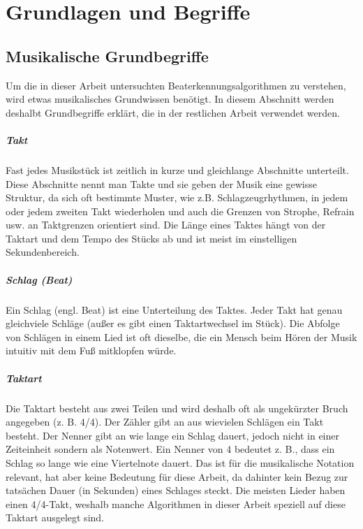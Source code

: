 \chapter{Grundlagen und Begriffe}
\label{grundlagen}

\section{Musikalische Grundbegriffe}
{
	Um die in dieser Arbeit untersuchten Beaterkennungsalgorithmen zu verstehen,
		wird etwas musikalisches Grundwissen benötigt.
	In diesem Abschnitt werden deshalbt Grundbegriffe erklärt,
		die in der restlichen Arbeit verwendet werden.

	\paragraph{Takt}
	{
		Fast jedes Musikstück ist zeitlich in kurze und gleichlange Abschnitte unterteilt.
		Diese Abschnitte nennt man Takte
			und sie geben der Musik eine gewisse Struktur,
			da sich oft bestimmte Muster, wie z.B. Schlagzeugrhythmen, in jedem oder jedem zweiten Takt wiederholen
			und auch die Grenzen von Strophe, Refrain usw. an Taktgrenzen orientiert sind.
		Die Länge eines Taktes hängt von der Taktart und dem Tempo des Stücks ab
			und ist meist im einstelligen Sekundenbereich.
	}

	\paragraph{Schlag (Beat)}
	{
		Ein Schlag (engl. Beat) ist eine Unterteilung des Taktes.
		Jeder Takt hat genau gleichviele Schläge (au{\ss}er es gibt einen Taktartwechsel im Stück).
		Die Abfolge von Schlägen in einem Lied ist oft dieselbe,
			die ein Mensch beim Hören der Musik intuitiv mit dem Fu{\ss} mitklopfen würde.
	}

	\paragraph{Taktart}
	{
		Die Taktart besteht aus zwei Teilen
			und wird deshalb oft als ungekürzter Bruch angegeben (z. B. 4/4).
		Der Zähler gibt an aus wievielen Schlägen ein Takt besteht.
		Der Nenner gibt an wie lange ein Schlag dauert,
			jedoch nicht in einer Zeiteinheit sondern als Notenwert.
		Ein Nenner von 4 bedeutet z. B., dass ein Schlag so lange wie eine Viertelnote dauert.
		Das ist für die musikalische Notation relevant,
			hat aber keine Bedeutung für diese Arbeit,
			da dahinter kein Bezug zur tatsächen Dauer (in Sekunden) eines Schlages steckt.
		Die meisten Lieder haben einen 4/4-Takt,
			weshalb manche Algorithmen in dieser Arbeit speziell auf diese Taktart ausgelegt sind.
	}

}
